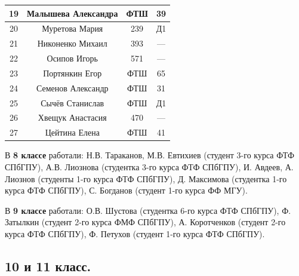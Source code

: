 \documentclass[11pt]{article}
\newlength{\h}
\newlength{\x}
\begin{document}
\begin{table}[ht]
\begin{minipage}[t]{0.45\linewidth}
\begin{tabular}[h]{|c|c|c|c|}
      19 & Малышева Александра & ФТШ & 39  \\ \hline
      20 & Муретова Мария & 239 & Д1  \\ \hline
      21 & Никоненко Михаил & 393 & ---  \\ \hline
      22 & Осипов Игорь & 571 & ---  \\ \hline
      23 & Портянкин Егор & ФТШ & 65  \\ \hline
      24 & Семенов Александр & ФТШ & 31  \\ \hline
      25 & Сычёв Станислав & ФТШ & Д1  \\ \hline
      26 & Хвещук Анастасия & 470 & ---  \\ \hline
      27 & Цейтина Елена & ФТШ & 41  \\ \hline
    \end{tabular}
  \end{minipage}
\end{table}

В \textbf{8 классе} работали: Н.В. Тараканов, М.В. Евтихиев (студент 3-го
курса ФТФ СПбГПУ), А.В. Лиознова (студентка 3-го курса ФТФ СПбГПУ),
И. Авдеев, А. Лиознов (студенты 1-го курса ФТФ СПбГПУ), Д. Максимова
(студентка 1-го курса ФТФ СПбГПУ), С. Богданов (студент 1-го курса ФФ
МГУ).

В \textbf{9 классе} работали: О.В. Шустова (студентка 6-го курса ФТФ СПбГПУ),
Ф. Затылкин (студент 2-го курса ФМФ СПбГПУ), А. Коротченков (студент
2-го курса ФТФ СПбГПУ), Ф. Петухов (студент 1-го курса ФТФ СПбГПУ). 

\clearpage

\subsection{10 и 11 класс.}
\label{sec:10and11}
\end{document}
